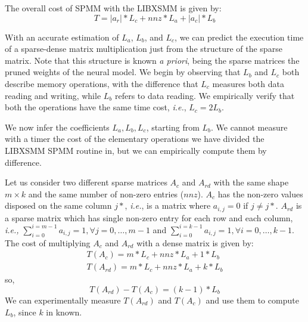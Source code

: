 The overall cost of SPMM with the LIBXSMM is given by: 
\begin{equation}
\label{eq:sparsepred}
	T = |a_r| * L_c +  nnz * L_a + |a_c| * L_b
\end{equation}


With an accurate estimation of $L_a$, $L_b$, and $L_c$, we can predict the execution time of a sparse-dense matrix multiplication just from the structure of the sparse matrix. Note that this structure is known \textit{a priori}, being the sparse matrices the pruned weights of the neural model. We begin by observing that $L_b$ and $L_c$ both describe memory operations, with the difference that $L_c$ measures both data reading and writing, while $L_b$ refers to data reading. We empirically verify that both the operations have the same time cost, \textit{i.e.}, $L_c = 2 L_b$. 

We now infer the coefficients $L_a, L_b, L_c$, starting from $L_b$. We cannot measure with a timer the cost of the elementary operations we have divided the LIBXSMM SPMM routine in, but we can empirically compute them by difference.

Let us consider two different sparse matrices $A_c$ and $A_{rd}$ with the same shape $m \times k$ and the same number of non-zero entries ($nnz$). $A_c$ has the non-zero values disposed on the same column $j*$, \textit{i.e.}, is a matrix where $a_{i,j} = 0 $ if $j \neq j*$. $A_{rd}$ is a sparse matrix which has single non-zero entry for each row and each column, \textit{i.e.,} $\sum_{i=0}^{i=m-1} a_{i,j} = 1, \forall j=0, \dots, m-1$  and $\sum_{i=0}^{i=k-1} a_{i,j} = 1,  \forall i=0, \dots, k-1$. 
The cost of multiplying $A_c$ and $A_{rd}$
with a dense matrix is given by:
\begin{align}
\nonumber
T (A_c) = m * L_c + nnz *L_a + 1 * L_b \\
\nonumber
T({A_{rd}}) = m * L_c + nnz *L_a + k * L_b
\end{align}
so, 
$$T(A_{rd}) - T({A_c}) =  (k-1) *L_b$$
We can experimentally measure  $T(A_{rd})$ and $T({A_c})$ and use them to compute $L_b$, since $k$ in known. 

